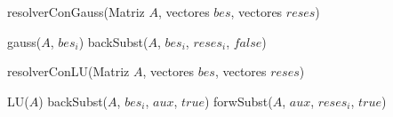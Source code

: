 \begin{algorithm}[H]
\caption{resolverConGauss(Matriz $A$, vectores $bes$, vectores $reses$)}
\label{pseudo:resGauss}
\begin{algorithmic}
	\STATE gauss($A$, $bes_{i}$)
	\STATE backSubst($A$, $bes_{i}$, $reses_{i}$, $false$)
\ENDFOR

\end{algorithmic}
\end{algorithm}

\begin{algorithm}[H]
\caption{resolverConLU(Matriz $A$, vectores $bes$, vectores $reses$)}
\label{pseudo:resLU}
\begin{algorithmic}
\STATE LU($A$)
	\STATE backSubst($A$, $bes_{i}$, $aux$, $true$)
	\STATE forwSubst($A$, $aux$, $reses_{i}$, $true$)
\ENDFOR


\end{algorithmic}
\end{algorithm}



